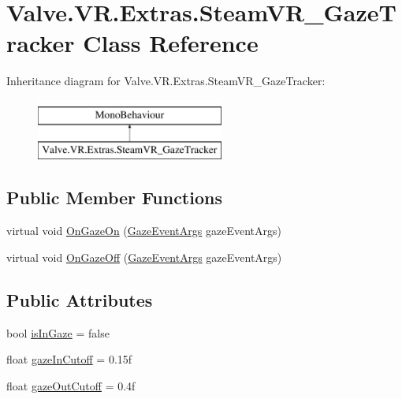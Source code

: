 \hypertarget{class_valve_1_1_v_r_1_1_extras_1_1_steam_v_r___gaze_tracker}{}\section{Valve.\+V\+R.\+Extras.\+Steam\+V\+R\+\_\+\+Gaze\+Tracker Class Reference}
\label{class_valve_1_1_v_r_1_1_extras_1_1_steam_v_r___gaze_tracker}
Inheritance diagram for Valve.\+V\+R.\+Extras.\+Steam\+V\+R\+\_\+\+Gaze\+Tracker\+:\begin{figure}[H]
\begin{center}
\leavevmode
\includegraphics[height=2.000000cm]{class_valve_1_1_v_r_1_1_extras_1_1_steam_v_r___gaze_tracker}
\end{center}
\end{figure}
\subsection*{Public Member Functions}
\begin{DoxyCompactItemize}
\item 
virtual void \mbox{\hyperlink{class_valve_1_1_v_r_1_1_extras_1_1_steam_v_r___gaze_tracker_a7e6346dc415e1331a705d0c648ae3545}{On\+Gaze\+On}} (\mbox{\hyperlink{struct_valve_1_1_v_r_1_1_extras_1_1_gaze_event_args}{Gaze\+Event\+Args}} gaze\+Event\+Args)
\item 
virtual void \mbox{\hyperlink{class_valve_1_1_v_r_1_1_extras_1_1_steam_v_r___gaze_tracker_a6521565fa9566d687c5d33121e4171bb}{On\+Gaze\+Off}} (\mbox{\hyperlink{struct_valve_1_1_v_r_1_1_extras_1_1_gaze_event_args}{Gaze\+Event\+Args}} gaze\+Event\+Args)
\end{DoxyCompactItemize}
\subsection*{Public Attributes}
\begin{DoxyCompactItemize}
\item 
bool \mbox{\hyperlink{class_valve_1_1_v_r_1_1_extras_1_1_steam_v_r___gaze_tracker_a982dde0c7f0b6c60f2663ef1580b40e0}{is\+In\+Gaze}} = false
\item 
float \mbox{\hyperlink{class_valve_1_1_v_r_1_1_extras_1_1_steam_v_r___gaze_tracker_a5dc1c1620ac73f8ea171e09635d54f42}{gaze\+In\+Cutoff}} = 0.\+15f
\item 
float \mbox{\hyperlink{class_valve_1_1_v_r_1_1_extras_1_1_steam_v_r___gaze_tracker_a676d3064936a95227ea674f34d988590}{gaze\+Out\+Cutoff}} = 0.\+4f
\end{DoxyCompactItemize}

